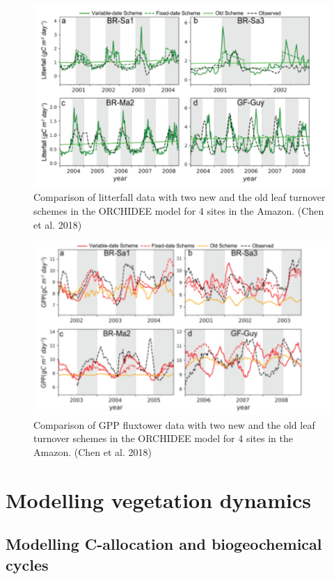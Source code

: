 \documentclass[12pt,oneside]{book}
\begin{document}
\begin{figure}

{\centering \includegraphics[width=0.8\linewidth]{figures/chap4/f412_chen2} 

}

\caption{Comparison of litterfall data with two new and the old leaf turnover schemes in the ORCHIDEE model for 4 sites in the Amazon. (Chen et al. 2018)}\label{fig:f412}
\end{figure}

\begin{figure}

{\centering \includegraphics[width=0.8\linewidth]{figures/chap4/f413_chen3} 

}

\caption{Comparison of GPP fluxtower data with two new and the old leaf turnover schemes in the ORCHIDEE model for 4 sites in the Amazon. (Chen et al. 2018)}\label{fig:f413}
\end{figure}

\part{Modelling vegetation
dynamics}\label{part-modelling-vegetation-dynamics}

\chapter{Modelling C-allocation and biogeochemical
cycles}\label{modelling-c-allocation-and-biogeochemical-cycles}
\end{document}
